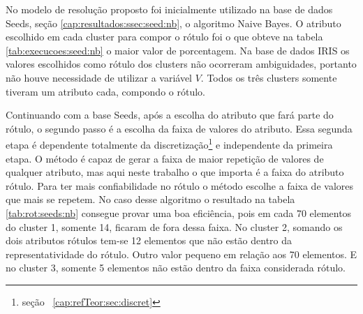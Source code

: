 No modelo de resolução proposto foi inicialmente utilizado na base de dados Seeds, seção \ref{cap:resultados:ssec:seed:nb}, o algoritmo Naive Bayes. O atributo escolhido em cada cluster para compor o rótulo foi o que obteve  na tabela \ref{tab:execucoes:seed:nb} o maior valor de porcentagem. Na base de dados IRIS os valores escolhidos como rótulo dos clusters  não ocorreram ambiguidades, portanto não houve necessidade de utilizar a variável ${V}$. Todos os três clusters somente tiveram um atributo cada, compondo o rótulo.

Continuando com a base Seeds, após a escolha do atributo que fará parte do rótulo, o segundo passo é a escolha da faixa de valores do atributo. Essa segunda etapa é dependente totalmente da discretização\footnote{seção ~\ref{cap:refTeor:sec:discret}} e independente da primeira etapa. O método é capaz de gerar a faixa de maior repetição de valores de qualquer atributo, mas aqui neste trabalho o que importa é a faixa do atributo rótulo. Para ter mais  confiabilidade  no rótulo o método escolhe a faixa de valores que mais se repetem. No caso desse algoritmo o resultado na tabela \ref{tab:rot:seeds:nb} consegue provar uma boa eficiência, pois em cada 70 elementos do cluster 1, somente 14, ficaram de fora dessa faixa. No cluster 2, somando os dois atributos rótulos tem-se 12 elementos que não estão dentro da representatividade do rótulo. Outro valor pequeno em relação aos 70 elementos. E no cluster 3, somente 5 elementos não estão dentro da faixa considerada rótulo.


